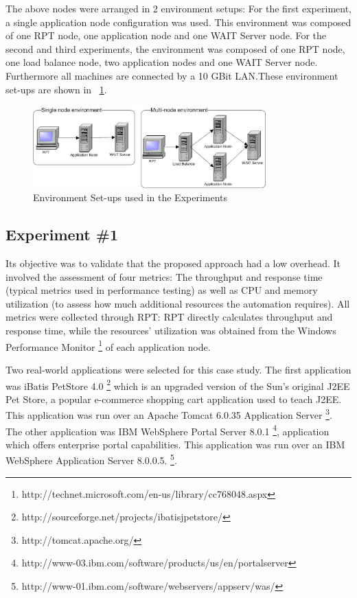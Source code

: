 \documentclass[runningheads,a4paper]{llncs}
\begin{document}
The above nodes were arranged in 2 environment setups: For the first
experiment, a single application node configuration was used. This environment was composed of one RPT node, 
one application node and one WAIT Server node. For the second and
third experiments, the environment was composed of one RPT node, one load
balance node, two application nodes and one WAIT Server node. Furthermore all
machines are connected by a 10 GBit LAN.These environment set-ups are shown in \figurename ~\ref{fig_env}.

\begin{figure}[!h]
\centering
\includegraphics[totalheight=.25\textheight,width=0.8\textwidth]{Environments}
\caption{Environment Set-ups used in the Experiments}
\label{fig_env}
\end{figure}

\subsection{Experiment \#1}

Its objective was to validate that the proposed approach had a low overhead.
It involved the assessment of four metrics: The throughput and response time
(typical metrics used in performance testing) as well as CPU and memory utilization (to assess how much additional resources the automation
requires). All metrics were collected through RPT: RPT directly
calculates throughput and response time, while the resources' utilization was
obtained from the Windows Performance Monitor \footnote{http://technet.microsoft.com/en-us/library/cc768048.aspx} of each application node.

Two real-world applications were selected for this case study. The first
application was iBatis PetStore 4.0
\footnote{http://sourceforge.net/projects/ibatisjpetstore/} which is an 
upgraded version of the Sun's original J2EE Pet Store, a popular e-commerce
shopping cart application used to teach J2EE. This application was run over an Apache
Tomcat 6.0.35 Application Server \footnote{http://tomcat.apache.org/}. The
other application was IBM WebSphere Portal Server 8.0.1
\footnote{http://www-03.ibm.com/software/products/us/en/portalserver},
application which offers enterprise portal capabilities. This application was
run over an IBM WebSphere Application Server 8.0.0.5.
\footnote{http://www-01.ibm.com/software/webservers/appserv/was/}.
\end{document}
